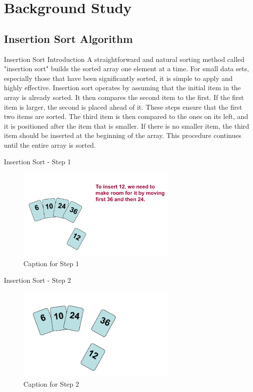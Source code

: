 \section{Background Study}
\subsection{Insertion Sort Algorithm}

\begin{frame}{Insertion Sort Introduction}
   A straightforward and natural sorting method called "insertion sort" builds the sorted array one element at a time. For small data sets, especially those that have been significantly sorted, it is simple to apply and highly effective.
Insertion sort operates by assuming that the initial item in the array is already sorted. It then compares the second item to the first. If the first item is larger, the second is placed ahead of it. These steps ensure that the first two items are sorted. The third item is then compared to the ones on its left, and it is positioned after the item that is smaller. If there is no smaller item, the third item should be inserted at the beginning of the array. This procedure continues until the entire array is sorted.


   
\end{frame}

\begin{frame}{Insertion Sort - Step 1}
    \begin{figure}
        \includegraphics[width=0.7\textwidth]{assets/ins1.png}
        \caption{Caption for Step 1}
    \end{figure}
\end{frame}

\begin{frame}{Insertion Sort - Step 2}
    \begin{figure}
        \includegraphics[width=0.7\textwidth]{assets/ins2.png}
        \caption{Caption for Step 2}
    \end{figure}
\end{frame}


